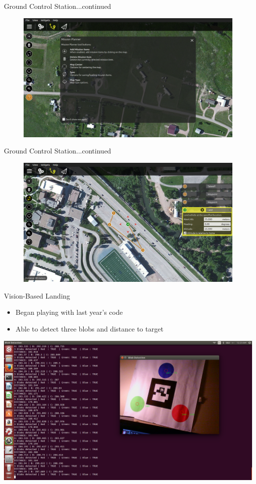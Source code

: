 \documentclass[11pt]{beamer}
\begin{document}
\begin{frame}{Ground Control Station...continued}
\begin{figure}
\includegraphics[width=1\textwidth]{images/selectmission}
\end{figure}
\end{frame}

\begin{frame}{Ground Control Station...continued}
\begin{figure}
\includegraphics[width=1\textwidth]{images/mission}
\end{figure}
\end{frame}

\begin{frame}{Vision-Based Landing}
	\begin{itemize}
		\item Began playing with last year's code
		\item Able to detect three blobs and distance to target
	\end{itemize}
	\includegraphics[width=1\textwidth]{images/coolpic}
\end{frame}
\end{document}
